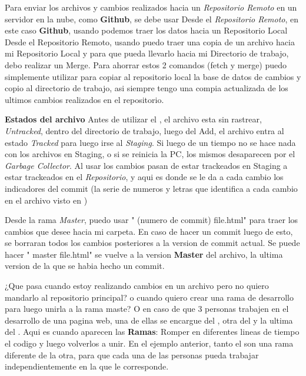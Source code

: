\documentclass[]{article} %
\begin{document}
Para enviar los archivos y cambios realizados hacia un \textit{Repositorio Remoto} en un servidor en la nube, como \textbf{Github}, se debe usar 
Desde el \textit{Repositorio Remoto}, en este caso \textbf{Github}, usando  podemos traer los datos hacia un Repositorio Local
Desde el Repositorio Remoto, usando  puedo traer una copia de un archivo hacia mi Repositorio Local y para que pueda llevarlo hacia mi Directorio de trabajo, debo realizar un Merge. Para ahorrar estos 2 comandos (fetch y merge) puedo simplemente utilizar  para copiar al repositorio local la base de datos de cambios y copio al directorio de trabajo, asi siempre tengo una compia actualizada de los ultimos cambios realizados en el repositorio.

\textbf{Estados del archivo}
Antes de utilizar el , el archivo esta sin rastrear, \textit{Untracked}, dentro del directorio de trabajo, luego del Add, el archivo entra al estado \textit{Tracked} para luego irse al \textit{Staging}. Si luego de un tiempo no se hace nada con los archivos en Staging, o si se reinicia la PC, los mismos desaparecen por el \textit{Garbage Collector}.
Al usar  los cambios pasan de estar trackeados en Staging a estar trackeados en el \textit{Repositorio}, y aqui es donde se le da a cada cambio los indicadores del commit (la serie de numeros y letras que identifica a cada cambio en el archivo visto en )

Desde la rama \textit{Master}, puedo usar " (numero de commit) file.html" para traer los cambios que desee hacia mi carpeta.
En caso de hacer un commit luego de esto, se borraran todos los cambios posteriores a la version de commit actual.
Se puede hacer " master file.html" se vuelve a la version \textbf{Master} del archivo, la ultima version de la que se habia hecho un commit.


¿Que pasa cuando estoy realizando cambios en un archivo pero no quiero mandarlo al repositorio principal? o cuando quiero crear una rama de desarrollo para luego unirla a la rama maste? O en caso de que 3 personas trabajen en el desarrollo de una pagina web, una de ellas se encargue del , otra del  y la ultima del .
Aqui es cuando aparecen las \textbf{Ramas}: Romper en diferentes lineas de tiempo el codigo y luego volverlos a unir. En el ejemplo anterior, tanto el  son una rama diferente de la otra, para que cada una de las personas pueda trabajar independientemente en la que le corresponde.
\end{document}
